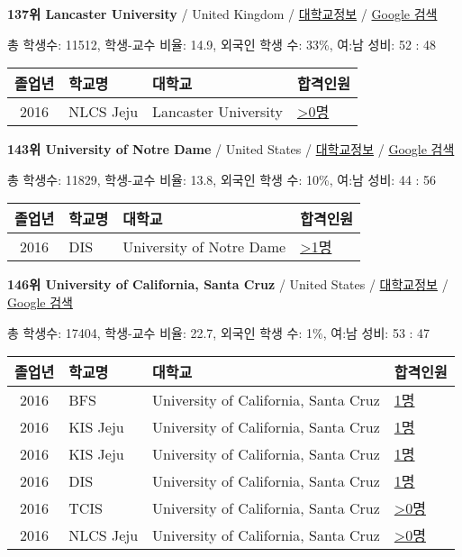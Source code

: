 \documentclass[13pt,]{article}
\begin{document}
\textbf{137위 Lancaster University} / United Kingdom /
\href{https://www.timeshighereducation.com/world-university-rankings/lancaster-university?ranking-dataset=589595}{대학교정보}
/ \href{http://www.google.com/search?q=Lancaster+University}{Google
검색}

총 학생수: 11512, 학생-교수 비율: 14.9, 외국인 학생 수: 33\%, 여:남
성비: 52 : 48

\begin{longtable}[]{@{}clll@{}}
\toprule
졸업년 & 학교명 & 대학교 & 합격인원\tabularnewline
\midrule
\endhead
2016 & NLCS Jeju & Lancaster University &
\href{http://cafe.naver.com/assarabia/11592}{\textgreater{}0명}\tabularnewline
\bottomrule
\end{longtable}

\textbf{143위 University of Notre Dame} / United States /
\href{https://www.timeshighereducation.com/world-university-rankings/university-of-notre-dame?ranking-dataset=589595}{대학교정보}
/ \href{http://www.google.com/search?q=University+of+Notre+Dame}{Google
검색}

총 학생수: 11829, 학생-교수 비율: 13.8, 외국인 학생 수: 10\%, 여:남
성비: 44 : 56

\begin{longtable}[]{@{}clll@{}}
\toprule
졸업년 & 학교명 & 대학교 & 합격인원\tabularnewline
\midrule
\endhead
2016 & DIS & University of Notre Dame &
\href{http://cafe.naver.com/assarabia/11591}{\textgreater{}1명}\tabularnewline
\bottomrule
\end{longtable}

\textbf{146위 University of California, Santa Cruz} / United States /
\href{https://www.timeshighereducation.com/world-university-rankings/university-of-california-santa-cruz?ranking-dataset=589595}{대학교정보}
/
\href{http://www.google.com/search?q=University+of+California,+Santa+Cruz}{Google
검색}

총 학생수: 17404, 학생-교수 비율: 22.7, 외국인 학생 수: 1\%, 여:남 성비:
53 : 47

\begin{longtable}[]{@{}clll@{}}
\toprule
졸업년 & 학교명 & 대학교 & 합격인원\tabularnewline
\midrule
\endhead
2016 & BFS & University of California, Santa Cruz &
\href{http://cafe.naver.com/assarabia/11597}{1명}\tabularnewline
2016 & KIS Jeju & University of California, Santa Cruz &
\href{http://cafe.naver.com/assarabia/11596}{1명}\tabularnewline
2016 & KIS Jeju & University of California, Santa Cruz &
\href{http://cafe.naver.com/assarabia/11596}{1명}\tabularnewline
2016 & DIS & University of California, Santa Cruz &
\href{http://cafe.naver.com/assarabia/11591}{1명}\tabularnewline
2016 & TCIS & University of California, Santa Cruz &
\href{http://cafe.naver.com/assarabia/11598}{\textgreater{}0명}\tabularnewline
2016 & NLCS Jeju & University of California, Santa Cruz &
\href{http://cafe.naver.com/assarabia/11592}{\textgreater{}0명}\tabularnewline
\bottomrule
\end{longtable}
\end{document}
